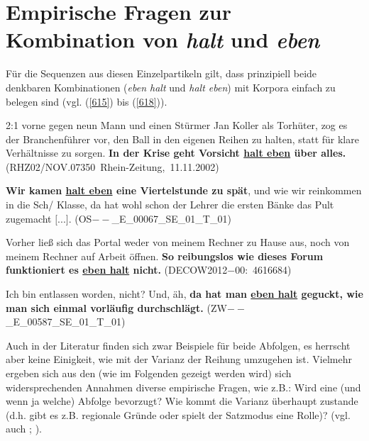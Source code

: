 \section{Empirische Fragen zur Kombination von \textit{halt} und \textit{eben}}
\label{sec:empirie}
Für die Sequenzen aus diesen Einzelpartikeln gilt, dass prinzipiell beide denkbaren Kombinationen (\textit{eben halt} und \textit{halt eben}) mit Korpora einfach zu belegen sind (vgl. (\ref{615}) bis (\ref{618})).

\begin{exe}
	\ex\label{615} 
	\scriptsize
	2:1 vorne gegen neun Mann und einen Stürmer Jan Koller als Torhüter, zog es der Branchenführer vor, den Ball in den 				eigenen Reihen zu halten, statt für klare Verhältnisse zu sorgen. \textbf{In der Krise geht Vorsicht \underline{halt 				eben} über alles.}
	\hfill\hbox{(RHZ02/NOV.07350 Rhein-Zeitung, 11.11.2002)}
\end{exe}

\begin{exe}
	\ex\label{616} 
	\scriptsize
	\textbf{Wir kamen \underline{halt eben} eine Viertelstunde zu spät}, und wie wir reinkommen in die
 	Sch/ Klasse, da hat wohl schon der Lehrer die ersten Bänke das Pult zugemacht $[$...$]$. 	
 	\hfill\hbox{(OS$\minus\minus$\_E\_00067\_SE\_01\_T\_01)}
\end{exe}
	
\begin{exe}
	\ex\label{617} 
	\scriptsize
	Vorher ließ sich das Portal weder von meinem Rechner zu Hause aus, noch von meinem Rechner auf Arbeit öffnen. 						\textbf{So reibungslos wie dieses Forum funktioniert es \underline{eben halt} nicht.}
	\newline
	\hbox{}\hfill\hbox{(DECOW2012$-$00: 4616684)}
\end{exe}
											    		                			      			       
\begin{exe}
	\ex\label{618}
	\scriptsize 
	Ich bin entlassen worden, nicht? Und, äh, \textbf{da hat man \underline{eben halt} geguckt, wie man sich einmal 					vorläufig durchschlägt.}    
	\hfill\hbox{(ZW$\minus\minus$\_E\_00587\_SE\_01\_T\_01)}                         	
\end{exe}	
Auch in der Literatur finden sich zwar Beispiele für beide Abfolgen, es herrscht aber keine Einigkeit, wie mit der Varianz der Reihung umzugehen ist. Vielmehr ergeben sich aus den (wie im Folgenden gezeigt werden wird) sich widersprechenden Annahmen diverse empirische Fragen, wie z.B.: Wird eine (und wenn ja welche) Abfolge bevorzugt? Wie kommt die Varianz überhaupt zustande (d.h. gibt es z.B. regionale Gründe oder spielt der Satzmodus eine Rolle)? (vgl. auch \citealt[144-165]{Mueller2016b}; \citeyear[233-238]{Mueller2017a}).

